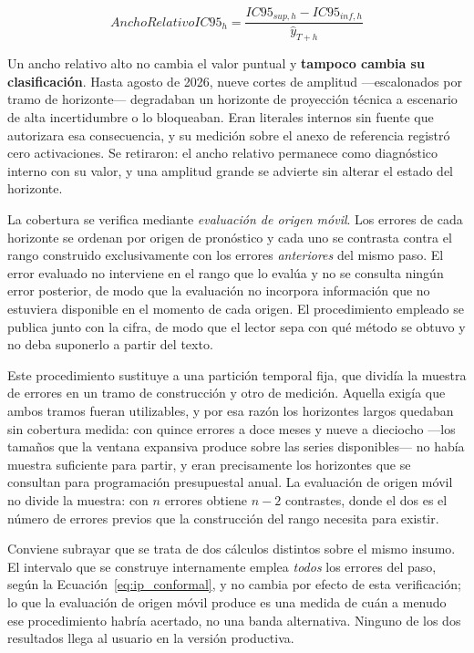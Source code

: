 \documentclass[12pt,letterpaper]{article}
\begin{document}
\begin{equation}
\label{eq:ancho_relativo_ic95}
AnchoRelativoIC95_h=\frac{IC95_{sup,h}-IC95_{inf,h}}{\hat{y}_{T+h}}
\end{equation}

Un ancho relativo alto no cambia el valor puntual y \textbf{tampoco cambia su clasificación}. Hasta agosto de 2026, nueve cortes de amplitud ---escalonados por tramo de horizonte--- degradaban un horizonte de proyección técnica a escenario de alta incertidumbre o lo bloqueaban. Eran literales internos sin fuente que autorizara esa consecuencia, y su medición sobre el anexo de referencia registró cero activaciones. Se retiraron: el ancho relativo permanece como diagnóstico interno con su valor, y una amplitud grande se advierte sin alterar el estado del horizonte.

La cobertura se verifica mediante \emph{evaluación de origen móvil}. Los errores de cada horizonte se ordenan por origen de pronóstico y cada uno se contrasta contra el rango construido exclusivamente con los errores \emph{anteriores} del mismo paso. El error evaluado no interviene en el rango que lo evalúa y no se consulta ningún error posterior, de modo que la evaluación no incorpora información que no estuviera disponible en el momento de cada origen. El procedimiento empleado se publica junto con la cifra, de modo que el lector sepa con qué método se obtuvo y no deba suponerlo a partir del texto.

Este procedimiento sustituye a una partición temporal fija, que dividía la muestra de errores en un tramo de construcción y otro de medición. Aquella exigía que ambos tramos fueran utilizables, y por esa razón los horizontes largos quedaban sin cobertura medida: con quince errores a doce meses y nueve a dieciocho ---los tamaños que la ventana expansiva produce sobre las series disponibles--- no había muestra suficiente para partir, y eran precisamente los horizontes que se consultan para programación presupuestal anual. La evaluación de origen móvil no divide la muestra: con $n$ errores obtiene $n-2$ contrastes, donde el dos es el número de errores previos que la construcción del rango necesita para existir.

Conviene subrayar que se trata de dos cálculos distintos sobre el mismo insumo. El intervalo que se construye internamente emplea \emph{todos} los errores del paso, según la Ecuación~\ref{eq:ip_conformal}, y no cambia por efecto de esta verificación; lo que la evaluación de origen móvil produce es una medida de cuán a menudo ese procedimiento habría acertado, no una banda alternativa. Ninguno de los dos resultados llega al usuario en la versión productiva.
\end{document}
